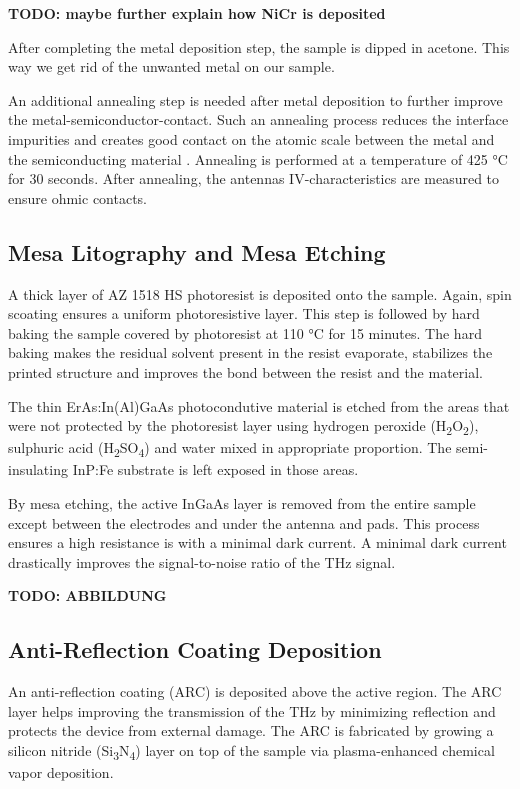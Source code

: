 \textbf{TODO: maybe further explain how NiCr is deposited}

After completing the metal deposition step, the sample is dipped in acetone. This way we get rid of the unwanted metal on our sample. 

An additional annealing step is needed after metal deposition to further improve the metal-semiconductor-contact. Such an annealing process reduces the interface impurities and creates good contact on the atomic scale between the metal and the semiconducting material \cite{tahamtanInvestigationEffectAnnealing2011}. Annealing is performed at a temperature of \num{425} \si{\celsius} for \num{30} seconds. After annealing, the antennas IV-characteristics are measured to ensure ohmic contacts. 

\subsection{Mesa Litography and Mesa Etching}

A thick layer of AZ 1518 HS photoresist is deposited onto the sample. Again, spin scoating ensures a uniform photoresistive layer. This step is followed by hard baking the sample covered by photoresist at \num{110} \si{\celsius} for \num{15} minutes. The hard baking makes the residual solvent present in the resist evaporate, stabilizes the printed structure and improves the bond between the resist and the material. 

The thin ErAs:In(Al)GaAs photocondutive material is etched from the areas that were not protected by the photoresist layer using 
hydrogen peroxide (H\textsubscript{2}O\textsubscript{2}), sulphuric acid (H\textsubscript{2}SO\textsubscript{4}) and water mixed in appropriate proportion. The semi-insulating InP:Fe substrate is left exposed in those areas. 

By mesa etching, the active InGaAs layer is removed from the entire sample except between the electrodes and under the antenna and pads. This process ensures a high resistance is with a minimal dark current. A minimal dark current drastically improves the signal-to-noise ratio of the THz signal. 

\textbf{TODO: ABBILDUNG}

\subsection{Anti-Reflection Coating Deposition}
An anti-reflection coating (ARC) is deposited above the active region. The ARC layer helps improving the transmission of the THz by minimizing reflection \cite{chenAntireflectionImplementationsTerahertz2014} and protects the device from external damage. The ARC is fabricated by growing a silicon nitride (Si\textsubscript{3}N\textsubscript{4}) layer on top of the sample via plasma-enhanced chemical vapor deposition. 

